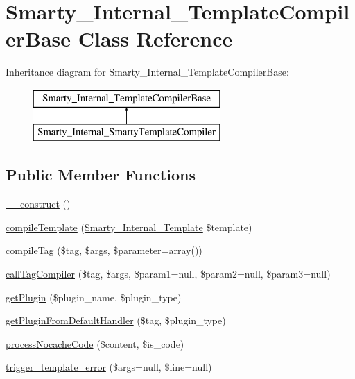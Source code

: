 \hypertarget{class_smarty___internal___template_compiler_base}{}\section{Smarty\+\_\+\+Internal\+\_\+\+Template\+Compiler\+Base Class Reference}
\label{class_smarty___internal___template_compiler_base}
Inheritance diagram for Smarty\+\_\+\+Internal\+\_\+\+Template\+Compiler\+Base\+:\begin{figure}[H]
\begin{center}
\leavevmode
\includegraphics[height=2.000000cm]{class_smarty___internal___template_compiler_base}
\end{center}
\end{figure}
\subsection*{Public Member Functions}
\begin{DoxyCompactItemize}
\item 
\hyperlink{class_smarty___internal___template_compiler_base_a095c5d389db211932136b53f25f39685}{\+\_\+\+\_\+construct} ()
\item 
\hyperlink{class_smarty___internal___template_compiler_base_a22797f5775a86723f2432e241400a178}{compile\+Template} (\hyperlink{class_smarty___internal___template}{Smarty\+\_\+\+Internal\+\_\+\+Template} \$template)
\item 
\hyperlink{class_smarty___internal___template_compiler_base_aeca44d38ff756e04286bba202f1b9f5c}{compile\+Tag} (\$tag, \$args, \$parameter=array())
\item 
\hyperlink{class_smarty___internal___template_compiler_base_a6956cee98955fafaf546c0bf0966865c}{call\+Tag\+Compiler} (\$tag, \$args, \$param1=null, \$param2=null, \$param3=null)
\item 
\hyperlink{class_smarty___internal___template_compiler_base_a58cf0a4fc76f22bcd34a262656952406}{get\+Plugin} (\$plugin\+\_\+name, \$plugin\+\_\+type)
\item 
\hyperlink{class_smarty___internal___template_compiler_base_ad7ec5ed8325ebd16588d7d8f4c50c417}{get\+Plugin\+From\+Default\+Handler} (\$tag, \$plugin\+\_\+type)
\item 
\hyperlink{class_smarty___internal___template_compiler_base_add66eb02adf3f5c8b1b29ec921b1bb8a}{process\+Nocache\+Code} (\$content, \$is\+\_\+code)
\item 
\hyperlink{class_smarty___internal___template_compiler_base_a734ce513daeda31c92e3058d6be46d75}{trigger\+\_\+template\+\_\+error} (\$args=null, \$line=null)
\end{DoxyCompactItemize}
